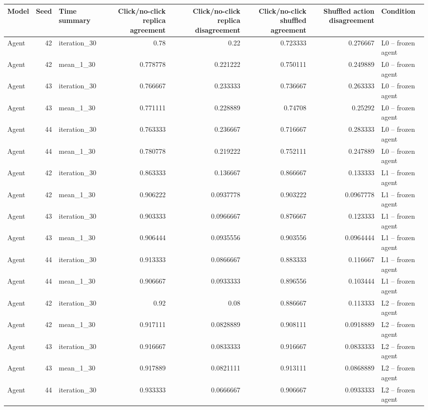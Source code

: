 \begin{table}[htbp!]
\centering
\small
\setlength{\tabcolsep}{3pt}
\renewcommand{\arraystretch}{1.1}
\begin{tabular}{lrlrrrrl}
\hline
Model & Seed & Time summary & Click/no-click replica agreement & Click/no-click replica disagreement & Click/no-click shuffled agreement & Shuffled action disagreement & Condition \\
\hline
Agent & 42 & iteration\_30 & 0.78 & 0.22 & 0.723333 & 0.276667 & L0 -- frozen agent \\
Agent & 42 & mean\_1\_30 & 0.778778 & 0.221222 & 0.750111 & 0.249889 & L0 -- frozen agent \\
Agent & 43 & iteration\_30 & 0.766667 & 0.233333 & 0.736667 & 0.263333 & L0 -- frozen agent \\
Agent & 43 & mean\_1\_30 & 0.771111 & 0.228889 & 0.74708 & 0.25292 & L0 -- frozen agent \\
Agent & 44 & iteration\_30 & 0.763333 & 0.236667 & 0.716667 & 0.283333 & L0 -- frozen agent \\
Agent & 44 & mean\_1\_30 & 0.780778 & 0.219222 & 0.752111 & 0.247889 & L0 -- frozen agent \\
Agent & 42 & iteration\_30 & 0.863333 & 0.136667 & 0.866667 & 0.133333 & L1 -- frozen agent \\
Agent & 42 & mean\_1\_30 & 0.906222 & 0.0937778 & 0.903222 & 0.0967778 & L1 -- frozen agent \\
Agent & 43 & iteration\_30 & 0.903333 & 0.0966667 & 0.876667 & 0.123333 & L1 -- frozen agent \\
Agent & 43 & mean\_1\_30 & 0.906444 & 0.0935556 & 0.903556 & 0.0964444 & L1 -- frozen agent \\
Agent & 44 & iteration\_30 & 0.913333 & 0.0866667 & 0.883333 & 0.116667 & L1 -- frozen agent \\
Agent & 44 & mean\_1\_30 & 0.906667 & 0.0933333 & 0.896556 & 0.103444 & L1 -- frozen agent \\
Agent & 42 & iteration\_30 & 0.92 & 0.08 & 0.886667 & 0.113333 & L2 -- frozen agent \\
Agent & 42 & mean\_1\_30 & 0.917111 & 0.0828889 & 0.908111 & 0.0918889 & L2 -- frozen agent \\
Agent & 43 & iteration\_30 & 0.916667 & 0.0833333 & 0.916667 & 0.0833333 & L2 -- frozen agent \\
Agent & 43 & mean\_1\_30 & 0.917889 & 0.0821111 & 0.913111 & 0.0868889 & L2 -- frozen agent \\
Agent & 44 & iteration\_30 & 0.933333 & 0.0666667 & 0.906667 & 0.0933333 & L2 -- frozen agent \\

\end{tabular}
\end{table}
